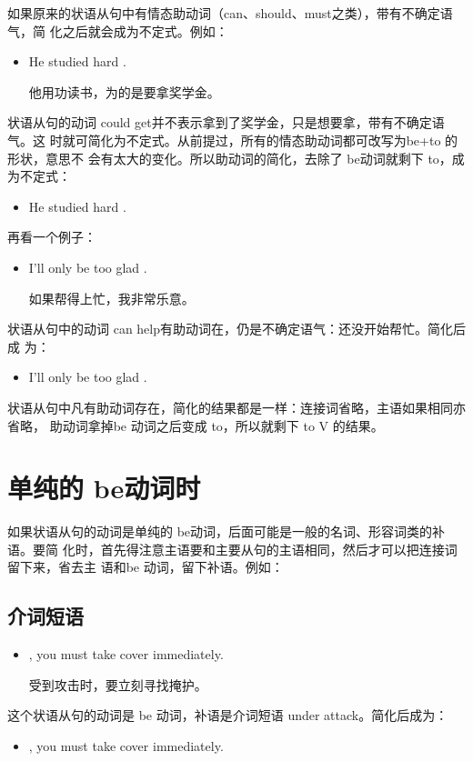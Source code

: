 如果原来的状语从句中有情态助动词（can、should、must之类），带有不确定语气，简
化之后就会成为不定式。例如：
\begin{itemize}
\item He studied hard .

  他用功读书，为的是要拿奖学金。
\end{itemize}
状语从句的动词 could get并不表示拿到了奖学金，只是想要拿，带有不确定语气。这
时就可简化为不定式。从前提过，所有的情态助动词都可改写为be+to 的形状，意思不
会有太大的变化。所以助动词的简化，去除了 be动词就剩下 to，成为不定式：
\begin{itemize}
\item He studied hard .
\end{itemize}

再看一个例子：
\begin{itemize}
\item I'll only be too glad .

  如果帮得上忙，我非常乐意。
\end{itemize}
状语从句中的动词 can help有助动词在，仍是不确定语气：还没开始帮忙。简化后成
为：
\begin{itemize}
\item   I'll only be too glad .
\end{itemize}

状语从句中凡有助动词存在，简化的结果都是一样：连接词省略，主语如果相同亦省略，
助动词拿掉be 动词之后变成 to，所以就剩下 to V 的结果。

\section{单纯的 be动词时}

如果状语从句的动词是单纯的 be动词，后面可能是一般的名词、形容词类的补语。要简
化时，首先得注意主语要和主要从句的主语相同，然后才可以把连接词留下来，省去主
语和be 动词，留下补语。例如：

\subsection{介词短语}

\begin{itemize}
\item {}, you must take cover immediately.

  受到攻击时，要立刻寻找掩护。
\end{itemize}
这个状语从句的动词是 be 动词，补语是介词短语 under attack。简化后成为：
\begin{itemize}
\item {}, you must take cover immediately.
\end{itemize}

